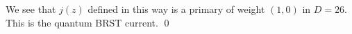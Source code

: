 \documentclass[a4paper,10pt]{article}
\begin{document}
\begin{enumerate}
\begin{enumerate}
	We see that $j(z)$ defined in this way is a primary of weight $(1,0)$ in $D = 26$. This is the quantum BRST current. 
	\qed
	
	

\end{enumerate}
\end{enumerate}
\end{document}
